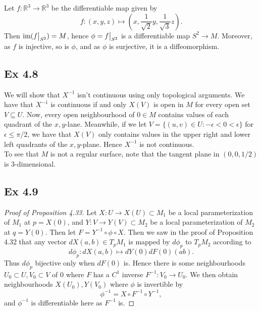 \documentclass{article}
\newcommand\restr[2]{{%
  \left.\kern-\nulldelimiterspace %
  #1 %
  \vphantom{\big|} %
  \right|_{#2} %
  }}
\theoremstyle{definition}
\newcommand{\R}{\mathbb{R}}
\newcommand{\im}{\text{im}}
\begin{document}
Let $f : \R^3 \to \R^3$ be the differentiable map given by
\[
	f : (x, y, z) \mapsto \left(x, \frac{1}{\sqrt{2}}y, \frac{1}{\sqrt{3}} z\right).
\] 
Then $\im(\restr{f}{S^2}) = M$, hence $\phi = \restr{f}{S^2}$ is a
differentiable map $S^2 \to M$. Moreover, as $f$ is injective, so is $\phi$,
and as $\phi$ is surjective, it is a diffeomorphism.

\subsection*{Ex 4.8}

We will show that $X^{-1}$ isn't continuous using only topological arguments.
We have that $X^{-1}$ is continuous if and only $X(V)$ is open in $M$ for every
open set $V \subseteq U$. Now, every open neighbourhood of $0 \in M$ contains
values of each quadrant of the $x, y$-lane. Meanwhile, if we let $V = \{(u, v)
\in U : -\epsilon < 0 < \epsilon \}$ for $\epsilon \leq \pi/2$, we have that
$X(V)$ only contains values in the upper right and lower left quadrants of the
$x, y$-plane. Hence $X^{-1}$ is not continuous. \\

To see that $M$ is not a regular surface, note that the tangent plane in
$(0,0,1/2)$ is $3$-dimensional.

\subsection*{Ex 4.9}

\begin{proof}[Proof of Proposition 4.33]

	Let $X : U \to X(U) \subset M_1$ be a local parameterization of $M_1$ at $p
	= X(0)$, and $Y : V \to Y(V) \subset M_2$ be a local parameterization of
	$M_2$ at $q = Y(0)$. Then let $F = Y^{-1} \circ \phi \circ X$. Then we saw
	in the proof of Proposition 4.32 that any vector $dX (a, b) \in T_p M_1$ is
	mapped by $d\phi_p$ to $T_p M_2$ according to
	\[
		d\phi_p
		:
		dX (a, b)
		\mapsto 
		dY(0) dF(0) (a b).
	\] 
	Thus $d\phi_p$ bijective only when $dF(0)$ is. Hence there is some
	neighbourhoods $U_0 \subset U, V_0 \subset V$ of $0$ where $F$ has a $C^1$
	inverse $F^{-1} : V_0 \to U_0$. We then obtain neighbourhoods $X(U_0),
	Y(V_0)$ where $\phi$ is invertible by
	\[
		\phi^{-1} = X \circ F^{-1} \circ Y^{-1},
	\] 
	and $\phi^{-1}$ is differentiable here as $F^{-1}$ is.

\end{proof}
\end{document}
